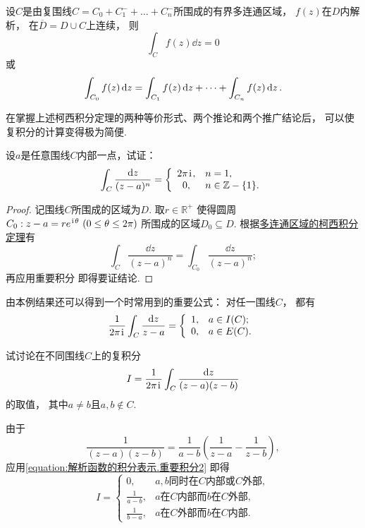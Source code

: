 \begin{theorem}[多连通区域的柯西积分定理]\label{theorem:解析函数的积分表示.多连通区域的柯西积分定理}
设\(C\)是由复围线\(C=C_0+C_1^-+\dots+C_n^-\)所围成的有界多连通区域，
\(f(z)\)在\(D\)内解析，
在\(\overline{D}=D \cup C\)上连续，
则\[
	\int_C f(z) \dd{z} = 0
\]或\begin{equation}
	\def\Ic#1{\int_{C_{#1}} f(z) \dd{z}}
	\Ic{0} = \Ic{1} + \dots + \Ic{n}.
\end{equation}
\end{theorem}

在掌握上述柯西积分定理的两种等价形式、两个推论和两个推广结论后，
可以使复积分的计算变得极为简便.

\begin{example}
设\(a\)是任意围线\(C\)内部一点，试证：\[
	\int_C \frac{\dd{z}}{(z-a)^n}
	= \left\{ \begin{array}{cl}
		2\pi\kern1pt\mathrm{i}\kern1pt, & n=1, \\
		0, & n\in\mathbb{Z}-\{1\}.
	\end{array} \right.
\]
\begin{proof}
记围线\(C\)所围成的区域为\(D\).
取\(r\in\mathbb{R}^+\)
使得圆周\(C_0: z - a = r e^{\kern1pt\mathrm{i}\kern1pt\theta}\ (0 \leq \theta \leq 2\pi)\)
所围成的区域\(D_0 \subseteq D\).
根据\hyperref[theorem:解析函数的积分表示.多连通区域的柯西积分定理]{多连通区域的柯西积分定理}有\[
	\int_C \frac{\dd{z}}{(z-a)^n} = \int_{C_0} \frac{\dd{z}}{(z-a)^n};
\]
再应用重要积分  即得要证结论.
\end{proof}
\end{example}
由本例结果还可以得到一个时常用到的重要公式：
对任一围线\(C\)，
都有\begin{equation}\label{equation:解析函数的积分表示.重要积分2}
	\frac{1}{2\pi\kern1pt\mathrm{i}\kern1pt}
	\int_C \frac{\dd{z}}{z-a}
	= \left\{ \begin{array}{ll}
		1, & a \in I(C); \\
		0, & a \in E(C).
	\end{array} \right.
\end{equation}

\begin{example}
试讨论在不同围线\(C\)上的复积分\[
	I = \frac{1}{2\pi\kern1pt\mathrm{i}\kern1pt} \int_C \frac{\dd{z}}{(z-a)(z-b)}
\]的取值，
其中\(a \neq b\)且\(a,b \notin C\).
\begin{solution}
由于\[
	\frac{1}{(z-a)(z-b)}
	= \frac{1}{a-b} \left(\frac{1}{z-a}-\frac{1}{z-b}\right),
\]
应用\cref{equation:解析函数的积分表示.重要积分2}
即得\[
	I = \left\{\begin{array}{cl}
		0, & \text{\(a,b\)同时在\(C\)内部或\(C\)外部}, \\
		\frac{1}{a-b}, & \text{\(a\)在\(C\)内部而\(b\)在\(C\)外部}, \\
		\frac{1}{b-a}, & \text{\(a\)在\(C\)外部而\(b\)在\(C\)内部}.
	\end{array}\right.
\]
\end{solution}
\end{example}

